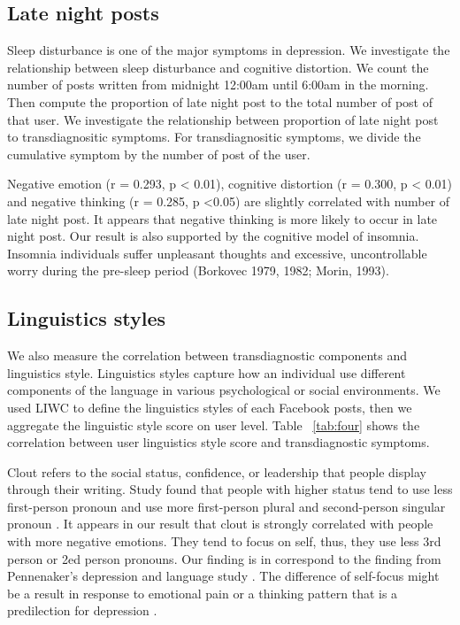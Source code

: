 \subsection{Late night posts}
Sleep disturbance is one of the major symptoms in depression. We investigate the relationship between sleep disturbance and cognitive distortion. We count the number of posts written from midnight 12:00am until 6:00am in the morning. Then compute the proportion of late night post to the total number of post of that user. We investigate the relationship between proportion of late night post to transdiagnositic symptoms. For transdiagnositic symptoms, we divide the cumulative symptom by the number of post of the user.

Negative emotion  (r = 0.293, p < 0.01), cognitive distortion (r = 0.300, p < 0.01) and negative thinking (r = 0.285, p <0.05) are slightly correlated with number of late night post. It appears that negative thinking is more likely to occur in late night post. Our result is also supported by the cognitive model of insomnia. Insomnia individuals suffer unpleasant thoughts and excessive, uncontrollable worry during the pre-sleep period (Borkovec 1979, 1982; Morin, 1993). 

\subsection{Linguistics styles}
We also measure the correlation between transdiagnostic components and linguistics style. Linguistics styles capture how an individual use different components of the language in various psychological or social environments. We used LIWC to define the linguistics styles of each Facebook posts, then we aggregate the linguistic style score on user level. Table ~\ref{tab:four} shows the correlation between user linguistics style score and transdiagnostic symptoms. 

Clout refers to the social status, confidence, or leadership that people display through their writing. Study found that people with higher status tend to use less first-person pronoun and use more first-person plural and second-person singular pronoun \cite{Kacewicz13}. It appears in our result that clout is strongly correlated with people with more negative emotions. They tend to focus on self, thus, they use less 3rd person or 2ed person pronouns. Our finding is in correspond to the finding from Pennenaker's depression and language study \cite{Pennebaker10}. The difference of self-focus might be a result in response to emotional pain or a thinking pattern that is a predilection for depression \cite{Wolf07}.

